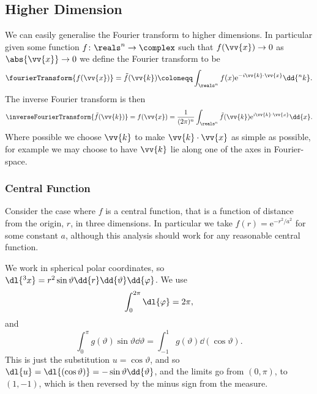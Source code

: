 \documentclass[fleqn]{NotesClass}
\newcommand*{\e}{\mathrm{e}}
\begin{document}
    \subsection{Higher Dimension}
    We can easily generalise the Fourier transform to higher dimensions.
    In particular given some function \(f \colon \reals^n \to \complex\) such that \(f(\vv{x}) \to 0\) as \(\abs{\vv{x}} \to 0\) we define the Fourier transform to be
    \begin{equation}
        \fourierTransform\{f(\vv{x})\} = \tilde{f}(\vv{k}) \coloneqq \int_{\reals^n} f(x) \e^{-i\vv{k} \cdot \vv{x}} \dd{^nk}.
    \end{equation}
    The inverse Fourier transform is then
    \begin{equation}
        \inverseFourierTransform\{\tilde{f}(\vv{k})\} = f(\vv{x}) = \frac{1}{(2\pi)^n} \int_{\reals^n} \tilde{f}(\vv{k}) \e^{i\vv{k} \cdot \vv{x}} \dd{x}.
    \end{equation}
    Where possible we choose \(\vv{k}\) to make \(\vv{k} \cdot \vv{x}\) as simple as possible, for example we may choose to have \(\vv{k}\) lie along one of the axes in Fourier-space.
    
    \subsubsection{Central Function}
    Consider the case where \(f\) is a central function, that is a function of distance from the origin, \(r\), in three dimensions.
    In particular we take \(f(r) = \e^{-r^2/a^2}\) for some constant \(a\), although this analysis should work for any reasonable central function.
    
    We work in spherical polar coordinates, so \(\dl{^3x} = r^2\sin\vartheta\dd{r}\dd{\vartheta}\dd{\varphi}\).
    We use
    \begin{equation}
        \int_{0}^{2\pi} \dl{\varphi} = 2\pi,
    \end{equation}
    and
    \begin{equation}
        \int_{0}^{\pi} g(\vartheta)\sin\vartheta \dd{\vartheta} = \int_{-1}^{1} g(\vartheta) \dd{(\cos\vartheta)}.
    \end{equation}
    This is just the substitution \(u = \cos\vartheta\), and so \(\dl{u} = \dl{(\cos\vartheta)} = -\sin\vartheta\dd{\vartheta}\), and the limits go from \((0, \pi)\), to \((1, -1)\), which is then reversed by the minus sign from the measure.
    
\end{document}
